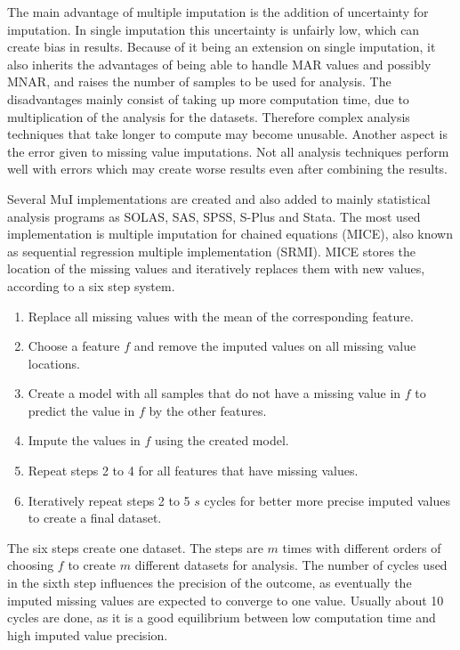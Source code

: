 \documentclass[10pt,a4paper]{report}
\begin{document}
	The main advantage of multiple imputation is the addition of uncertainty for imputation. In single imputation this uncertainty is unfairly low, which can create bias in results. Because of it being an extension on single imputation, it also inherits the advantages of being able to handle MAR values and possibly MNAR, and raises the number of samples to be used for analysis\cite{van2006imputation, pedersen2017missing}. The disadvantages mainly consist of taking up more computation time, due to multiplication of the analysis for the datasets. Therefore complex analysis techniques that take longer to compute may become unusable. Another aspect is the error given to missing value imputations. Not all analysis techniques perform well with errors which may create worse results even after combining the results\cite{pedersen2017missing}.
	
	Several MuI implementations are created and also added to mainly statistical analysis programs as SOLAS, SAS, SPSS, S-Plus and Stata\cite{horton2001multiple, allison2000multiple, royston2011multiple}. The most used implementation is multiple imputation for chained equations (MICE)\cite{azur2011multiple, royston2004multiple}, also known as sequential regression multiple implementation (SRMI)\cite{he2010multiple}. MICE stores the location of the missing values and iteratively replaces them with new values, according to a six step system\cite{azur2011multiple}. 
	
	\begin{enumerate}
		\item Replace all missing values with the mean of the corresponding feature.
		\item Choose a feature $f$ and remove the imputed values on all missing value locations.
		\item Create a model with all samples that do not have a missing value in $f$ to predict the value in $f$ by the other features.
		\item Impute the values in $f$ using the created model.
		\item Repeat steps 2 to 4 for all features that have missing values.
		\item Iteratively repeat steps 2 to 5 $s$ cycles for better more precise imputed values to create a final dataset.
	\end{enumerate}
	
	The six steps create one dataset. The steps are $m$ times with different orders of choosing $f$ to create $m$ different datasets for analysis. The number of cycles used in the sixth step influences the precision of the outcome, as eventually the imputed missing values are expected to converge to one value. Usually about 10 cycles are done, as it is a good equilibrium between low computation time and high imputed value precision\cite{azur2011multiple, royston2004multiple}.
	
\end{document}
